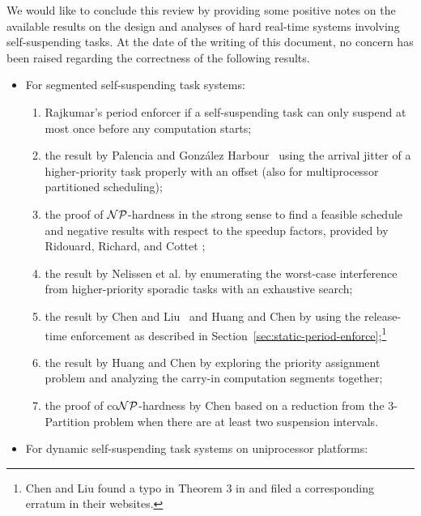 We would like to conclude this review by providing some positive notes on the available results on the design and analyses of hard real-time systems
involving self-suspending tasks.  At the date of the writing of this
document, no concern has been raised regarding the correctness of the following results. %
\begin{itemize}
\item For segmented self-suspending task systems: 
  \begin{enumerate}
  \item Rajkumar's period enforcer \cite{Raj:suspension1991}
    if a self-suspending task
    can only suspend at most once before any computation starts;
  \item the result by Palencia and Gonz\'alez
    Harbour~\cite{PH:rtss98} using the arrival jitter of a
    higher-priority task properly with an offset (also for
    multiprocessor partitioned scheduling);
  \item the proof of ${\cal NP}$-hardness in the strong sense to find a feasible
    schedule and negative results with respect to the speedup factors,
    provided by Ridouard, Richard, and Cottet \cite{Ridouard_2004};
  \item the result by Nelissen et al. \cite{ecrts15nelissen} by
    enumerating the worst-case interference from higher-priority
    sporadic tasks with an exhaustive search;
  \item the result by Chen and Liu~\cite{RTSS-ChenL14} and Huang and
    Chen \cite{WC16-suspend-DATE} by using the release-time
    enforcement as described in
    Section~\ref{sec:static-period-enforce};\footnote{Chen and Liu
      found a typo in Theorem 3 in \cite{RTSS-ChenL14}
      and filed a corresponding erratum in their websites.}
  \item the result by Huang and Chen \cite{Huang:multiseg} by
    exploring the priority assignment problem and analyzing the
    carry-in computation segments together;
 \item the proof of co${\cal NP}$-hardness by Chen \cite{RTSS2016-suspension} based on
   a reduction from the 3-Partition problem when there are at least two suspension intervals.
  \end{enumerate}
\item For dynamic self-suspending task systems on uniprocessor
  platforms:
  \begin{enumerate}
  \item the analysis provided in~\cite[Pages

\end{enumerate}
\end{itemize}
